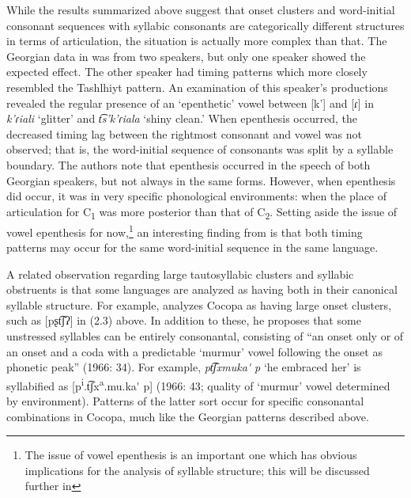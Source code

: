   While the results summarized above suggest that onset clusters and word-initial consonant sequences with syllabic consonants are categorically different structures in terms of articulation, the situation is actually more complex than that. The Georgian data in \citet{GoldsteinEtAl2007} was from two speakers, but only one speaker showed the expected effect. The other speaker had timing patterns which more closely resembled the Tashlhiyt pattern. An examination of this speaker’s productions revealed the regular presence of an ‘epenthetic’ vowel between [k’] and [ɾ] in \textit{k'ɾiali} ‘glitter’ and \textit{t͡s’k’ɾiala} ‘shiny clean.’ When epenthesis occurred, the decreased timing lag between the rightmost consonant and vowel was not observed; that is, the word-initial sequence of consonants was split by a syllable boundary. The authors note that epenthesis occurred in the speech of both Georgian speakers, but not always in the same forms. However, when epenthesis did occur, it was in very specific phonological environments: when the place of articulation for C\textsubscript{1} was more posterior than that of C\textsubscript{2}. Setting aside the issue of vowel epenthesis for now,\footnote{ \textrm{The issue of vowel epenthesis is an important one which has obvious implications for the analysis of syllable structure; this will be discussed further in }} an interesting finding from \citet{GoldsteinEtAl2007} is that both timing patterns may occur for the same word-initial sequence in the same language.



  A related observation regarding large tautosyllabic clusters and syllabic obstruents is that some languages are analyzed as having both in their canonical syllable structure. For example, \citet{Crawford1966} analyzes Cocopa as having large onset clusters, such as [pʂt͡ʃʔ] in (2.3) above. In addition to these, he proposes that some unstressed syllables can be entirely consonantal, consisting of “an onset only or of an onset and a coda with a predictable ‘murmur’ vowel following the onset as phonetic peak” (1966: 34). For example, \textit{pt͡ʃxmuka\'{} p} ‘he embraced her’ is syllabified as [p\textsuperscript{i}.t͡ʃx\textsuperscript{a}.mu.ka\'{} p] (1966: 43; quality of ‘murmur’ vowel determined by environment). Patterns of the latter sort occur for specific consonantal combinations in Cocopa, much like the Georgian patterns described above. 



